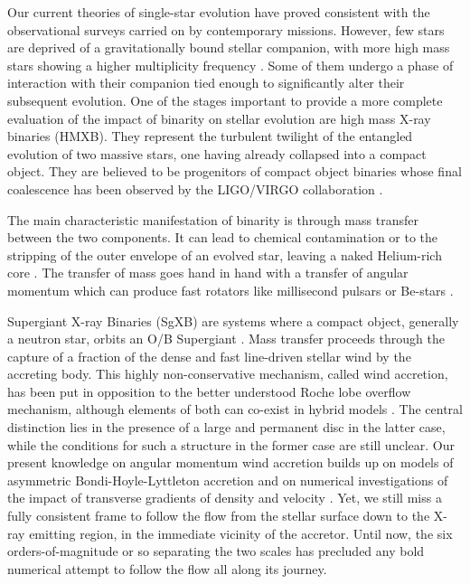 \documentclass{aa}
\makeatletter
\newcommand{\sgx}{SgXB\xspace}
\newcommand*{\hmxb}{HMXB\@\xspace}
\newcommand*{\eg}{e.g.\@\xspace}
\makeatother
\begin{document}
Our current theories of single-star evolution have proved consistent with the observational surveys carried on by contemporary missions. However, few stars are deprived of a gravitationally bound stellar companion, with more high mass stars showing a higher multiplicity frequency \citep{Duchene2013}. Some of them undergo a phase of interaction with their companion tied enough to significantly alter their subsequent evolution. One of the stages important to provide a more complete evaluation of the impact of binarity on stellar evolution are high mass X-ray binaries (\hmxb). They represent the turbulent twilight of the entangled evolution of two massive stars, one having already collapsed into a compact object. They are believed to be progenitors of compact object binaries whose final coalescence has been observed by the LIGO/VIRGO collaboration \citep{Abbott2016a}.

The main characteristic manifestation of binarity is through mass transfer between the two components. It can lead to chemical contamination \citep[\eg in the case of Barium and Carbon-enhanced metal-poor stars][]{Boffin2014,Masseron2009} or to the stripping of the outer envelope of an evolved star, leaving a naked Helium-rich core \citep[\eg for some hot subdwarf stars][]{XXX Podsiadlowski2010, Mereghetti2014 or Han? XXX}. The transfer of mass goes hand in hand with a transfer of angular momentum which can produce fast rotators like millisecond pulsars \citep{XXX Podsiadlowski2010? XXX} or Be-stars \citep{XXX Podsiadlowski2010? XXX}.

Supergiant X-ray Binaries (\sgx) are systems where a compact object, generally a neutron star, orbits an O/B Supergiant \citep[see][for a recent review]{Martinez-Nunez2017}. Mass transfer proceeds through the capture of a fraction of the dense and fast line-driven stellar wind by the accreting body. This highly non-conservative mechanism, called wind accretion, has been put in opposition to the better understood Roche lobe overflow mechanism, although elements of both can co-exist in hybrid models \citep{Mohamed,ElMellah2016a}. The central distinction lies in the presence of a large and permanent disc in the latter case, while the conditions for such a structure in the former case are still unclear. Our present knowledge on angular momentum wind accretion builds up on models of asymmetric Bondi-Hoyle-Lyttleton accretion \citep{Illarionov1975,Shapiro1976} and on numerical investigations of the impact of transverse gradients of density \citep{Ruffert1999,MacLeod2015} and velocity \citep{Ruffert1996}. Yet, we still miss a fully consistent frame to follow the flow from the stellar surface down to the X-ray emitting region, in the immediate vicinity of the accretor. Until now, the six orders-of-magnitude or so separating the two scales has precluded any bold numerical attempt to follow the flow all along its journey.
\end{document}
